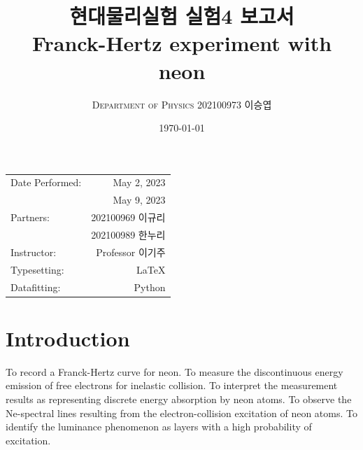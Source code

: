 \documentclass[a4paper, 10pt, nanum]{CSUniSchoolLabReport}
\title{현대물리실험 실험4 보고서 \\ Franck-Hertz experiment with neon} %
\author{\textsc{Department of Physics} 202100973 이승엽}
\date{\today}
\begin{document}
\maketitle %

\begin{center}
	\begin{tabular}{l r}
		Date Performed: & May 2, 2023 \\ %
		& May 9, 2023 \\
		Partners: & 202100969 이규리 \\ %
		& 202100989 한누리 \\
		Instructor: & Professor 이기주 \\ %
		Typesetting: & LaTeX \\
		Datafitting: & Python \\
	\end{tabular}
\end{center}


\maketitle


\section{Introduction}

  To record a Franck-Hertz curve for neon. To measure the discontinuous energy emission of free electrons for inelastic collision. To interpret the measurement results as representing discrete energy absorption by neon atoms. To observe the Ne-spectral lines resulting from the electron-collision excitation of neon atoms. To identify the luminance phenomenon as layers with a high probability of excitation. 

\end{document}
